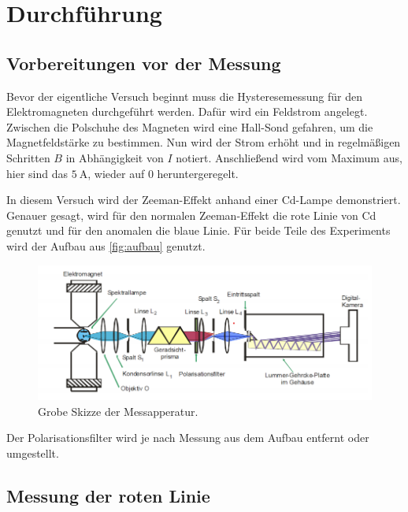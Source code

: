 \section{Durchführung}
\label{sec:Durchführung}

\subsection{Vorbereitungen vor der Messung}
\label{ssec:durch1}

Bevor der eigentliche Versuch beginnt muss die Hysteresemessung für den Elektromagneten durchgeführt werden.
Dafür wird ein Feldstrom angelegt.
Zwischen die Polschuhe des Magneten wird eine Hall-Sond gefahren, um die Magnetfeldstärke zu bestimmen.
Nun wird der Strom erhöht und in regelmäßigen Schritten $B$ in Abhängigkeit von $I$ notiert. 
Anschließend wird vom Maximum aus, hier sind das $\SI{5}{\ampere}$, wieder auf $0$ heruntergeregelt.

In diesem Versuch wird der Zeeman-Effekt anhand einer Cd-Lampe demonstriert.
Genauer gesagt, wird für den normalen Zeeman-Effekt die rote Linie von Cd genutzt und für den anomalen die blaue Linie.
Für beide Teile des Experiments wird der Aufbau aus \autoref{fig:aufbau} genutzt. 
\begin{figure}
    \centering
    \includegraphics[width=\textwidth]{images/aufbau1.png}
    \caption{Grobe Skizze der Messapperatur. \cite{V27}}
    \label{fig:aufbau}
\end{figure}
Der Polarisationsfilter wird je nach Messung aus dem Aufbau entfernt oder umgestellt.

\subsection{Messung der roten Linie}
\label{ssec:durch2}

